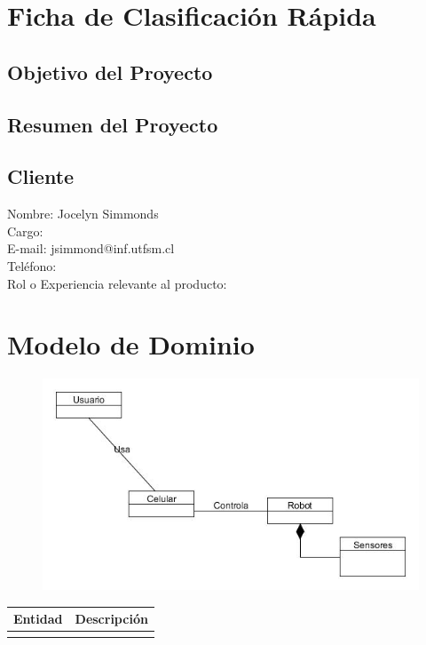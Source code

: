 \documentclass[letterpaper,12pt]{article} %
\numberwithin{equation}{section} %
\numberwithin{figure}{section} %
\numberwithin{table}{section} %
\begin{document}
\setcounter{page}{1} %

\tableofcontents
\newpage

\section{Ficha de Clasificaci\'on R\'apida}
\subsection{Objetivo del Proyecto} %
\subsection{Resumen del Proyecto} %
\subsection{Cliente}
Nombre: Jocelyn Simmonds\\
Cargo: \\
E-mail: jsimmond@inf.utfsm.cl\\
Tel\'efono: \\
Rol o Experiencia relevante al producto:

\newpage
\section{Modelo de Dominio}

\begin{figure}
   \centering
     \includegraphics[scale=0.5]{ModeloDominio.jpg}
   \caption{}
   \label{fig:ModeloDominio}
\end{figure}


\begin{table}[hb!]
  \begin{tabular}{lp{7cm}}\hline
    Entidad & Descripci\'on \\ \hline \hline %
    & \\ \hline
  \end{tabular}
\end{table}
\end{document}

